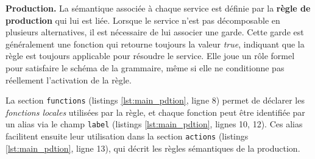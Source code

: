 
\textbf{Production.}
La sémantique associée à chaque service est définie par la \textbf{règle de production} qui lui est liée.
Lorsque le service n’est pas décomposable en plusieurs alternatives, il est nécessaire de lui associer une garde. Cette garde est généralement une fonction qui retourne toujours la valeur \textit{true}, indiquant que la règle est toujours applicable pour résoudre le service. Elle joue un rôle formel pour satisfaire le schéma de la grammaire, même si elle ne conditionne pas réellement l’activation de la règle.

La section \texttt{functions} (listings \ref{lst:main_pdtion}, ligne 8) permet de déclarer les \textit{fonctions locales} utilisées par la règle, et chaque fonction peut être identifiée par un alias via le champ \texttt{label} (listings \ref{lst:main_pdtion}, lignes 10, 12). Ces alias facilitent ensuite leur utilisation dans la section \texttt{actions} (listings \ref{lst:main_pdtion}, ligne 13), qui décrit les règles sémantiques de la production.\\

